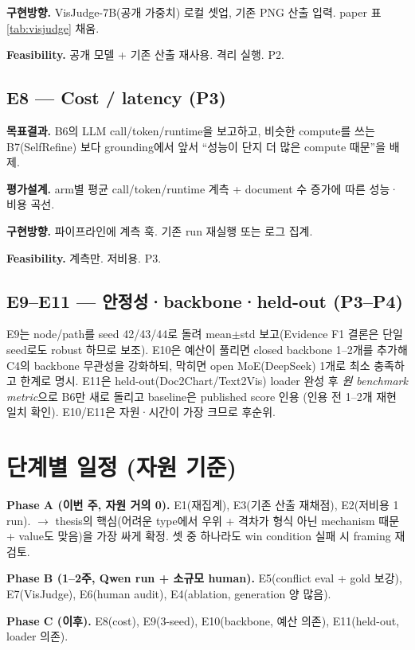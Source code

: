 \documentclass[11pt]{article}
\begin{document}
\textbf{구현방향.} VisJudge-7B(공개 가중치) 로컬 셋업, 기존 PNG 산출 입력. paper 표
\ref{tab:visjudge} 채움.

\textbf{Feasibility.} 공개 모델 + 기존 산출 재사용. 격리 실행. P2.

\subsection{E8 — Cost / latency (P3)}

\textbf{목표결과.} B6의 LLM call/token/runtime을 보고하고, 비슷한 compute를 쓰는 B7(SelfRefine)
보다 grounding에서 앞서 ``성능이 단지 더 많은 compute 때문''을 배제.

\textbf{평가설계.} arm별 평균 call/token/runtime 계측 + document 수 증가에 따른 성능·비용 곡선.

\textbf{구현방향.} 파이프라인에 계측 훅. 기존 run 재실행 또는 로그 집계.

\textbf{Feasibility.} 계측만. 저비용. P3.

\subsection{E9--E11 — 안정성·backbone·held-out (P3--P4)}

E9는 node/path를 seed 42/43/44로 돌려 mean$\pm$std 보고(Evidence F1 결론은 단일 seed로도 robust
하므로 보조). E10은 예산이 풀리면 closed backbone 1--2개를 추가해 C4의 backbone 무관성을 강화하되,
막히면 open MoE(DeepSeek) 1개로 최소 충족하고 한계로 명시. E11은 held-out(Doc2Chart/Text2Vis)
loader 완성 후 \emph{원 benchmark metric}으로 B6만 새로 돌리고 baseline은 published score 인용
(인용 전 1--2개 재현 일치 확인). E10/E11은 자원·시간이 가장 크므로 후순위.

\section{단계별 일정 (자원 기준)}

\textbf{Phase A (이번 주, 자원 거의 0).} E1(재집계), E3(기존 산출 재채점), E2(저비용 1 run).
$\rightarrow$ thesis의 핵심(어려운 type에서 우위 + 격차가 형식 아닌 mechanism 때문 + value도
맞음)을 가장 싸게 확정. 셋 중 하나라도 win condition 실패 시 framing 재검토.

\textbf{Phase B (1--2주, Qwen run + 소규모 human).} E5(conflict eval + gold 보강), E7(VisJudge),
E6(human audit), E4(ablation, generation 양 많음).

\textbf{Phase C (이후).} E8(cost), E9(3-seed), E10(backbone, 예산 의존), E11(held-out, loader
의존).
\end{document}
